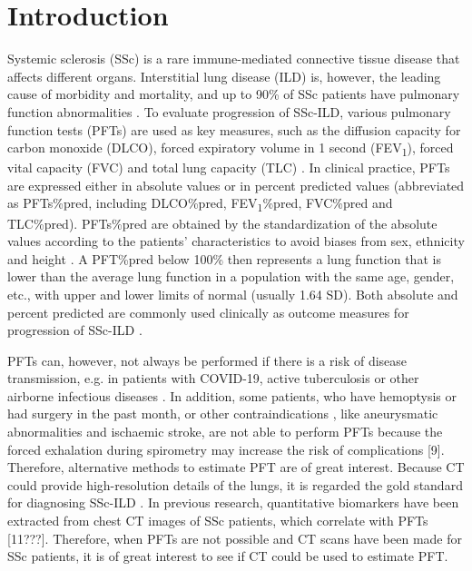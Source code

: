 \section{Introduction}
Systemic sclerosis (SSc) is a rare immune-mediated connective tissue disease that affects different organs. Interstitial lung disease (ILD) is, however, the leading cause of morbidity and mortality, and up to 90\% of SSc patients have pulmonary function abnormalities \cite{Behr2008}. To evaluate progression of SSc-ILD, various pulmonary function tests (PFTs) are used as key measures, such as the diffusion capacity for carbon monoxide (DLCO), forced expiratory volume in 1 second (FEV\textsubscript{1}), forced vital capacity (FVC) and total lung capacity (TLC) \cite{Behr2008, Caron2018, Ninaber2015}. In clinical practice, PFTs are expressed either in absolute values or in percent predicted values (abbreviated as PFTs\%pred, including DLCO\%pred, FEV\textsubscript{1}\%pred, FVC\%pred and TLC\%pred). PFTs\%pred are obtained by the standardization of the absolute values according to the patients’ characteristics to avoid biases from sex, ethnicity and height \cite{Graham2019}. A PFT\%pred below 100\% then represents a lung function that is lower than the average lung function in a population with the same age, gender, etc., with upper and lower limits of normal (usually 1.64 SD). Both absolute and percent predicted are commonly used clinically as outcome measures for progression of SSc-ILD \cite{Caron2018}. 

PFTs can, however, not always be performed if there is a risk of disease transmission, e.g. in patients with COVID-19, active tuberculosis or other airborne infectious diseases \cite{choi2022automated, McGowan2022}. In addition, some patients, who have hemoptysis or had surgery in the past month, or other contraindications \cite{Cooper, Meng2023}, like aneurysmatic abnormalities and ischaemic stroke, are not able to perform PFTs because the forced exhalation during spirometry may increase the risk of complications [9]. Therefore, alternative methods to estimate PFT are of great interest. Because CT could provide high-resolution details of the lungs, it is regarded the gold standard for diagnosing SSc-ILD \cite{Sylvester2020}. In previous research, quantitative biomarkers have been extracted from chest CT images of SSc patients, which correlate with PFTs [11???]. Therefore, when PFTs are not possible and CT scans have been made for SSc patients, it is of great interest to see if CT could be used to estimate PFT.

